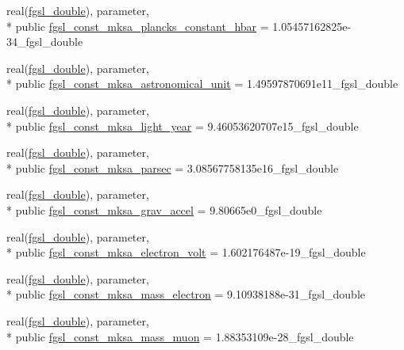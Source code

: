 \begin{DoxyCompactItemize}
\item 
real(\hyperlink{classfgsl_a9af5113378e0f000eb479d3f90196ddf}{fgsl\-\_\-double}), parameter, \\*
public \hyperlink{classfgsl_a505da32ff79a7c317534298642a2ac3c}{fgsl\-\_\-const\-\_\-mksa\-\_\-plancks\-\_\-constant\-\_\-hbar} = 1.\-05457162825e-\/34\-\_\-fgsl\-\_\-double
\item 
real(\hyperlink{classfgsl_a9af5113378e0f000eb479d3f90196ddf}{fgsl\-\_\-double}), parameter, \\*
public \hyperlink{classfgsl_aa2d41436d179db0d4d442c5207737611}{fgsl\-\_\-const\-\_\-mksa\-\_\-astronomical\-\_\-unit} = 1.\-49597870691e11\-\_\-fgsl\-\_\-double
\item 
real(\hyperlink{classfgsl_a9af5113378e0f000eb479d3f90196ddf}{fgsl\-\_\-double}), parameter, \\*
public \hyperlink{classfgsl_ac9efe31fa2e902dc8cced7ce8b82c610}{fgsl\-\_\-const\-\_\-mksa\-\_\-light\-\_\-year} = 9.\-46053620707e15\-\_\-fgsl\-\_\-double
\item 
real(\hyperlink{classfgsl_a9af5113378e0f000eb479d3f90196ddf}{fgsl\-\_\-double}), parameter, \\*
public \hyperlink{classfgsl_ab701318a50ffa3b0b31f26f7882a2b16}{fgsl\-\_\-const\-\_\-mksa\-\_\-parsec} = 3.\-08567758135e16\-\_\-fgsl\-\_\-double
\item 
real(\hyperlink{classfgsl_a9af5113378e0f000eb479d3f90196ddf}{fgsl\-\_\-double}), parameter, \\*
public \hyperlink{classfgsl_a7c644841a5ff5cd815dca7cfc3383642}{fgsl\-\_\-const\-\_\-mksa\-\_\-grav\-\_\-accel} = 9.\-80665e0\-\_\-fgsl\-\_\-double
\item 
real(\hyperlink{classfgsl_a9af5113378e0f000eb479d3f90196ddf}{fgsl\-\_\-double}), parameter, \\*
public \hyperlink{classfgsl_a2b715db04903e667b5f50d6df3054bee}{fgsl\-\_\-const\-\_\-mksa\-\_\-electron\-\_\-volt} = 1.\-602176487e-\/19\-\_\-fgsl\-\_\-double
\item 
real(\hyperlink{classfgsl_a9af5113378e0f000eb479d3f90196ddf}{fgsl\-\_\-double}), parameter, \\*
public \hyperlink{classfgsl_a9b37f99c3856817b93dd18bc94b81725}{fgsl\-\_\-const\-\_\-mksa\-\_\-mass\-\_\-electron} = 9.\-10938188e-\/31\-\_\-fgsl\-\_\-double
\item 
real(\hyperlink{classfgsl_a9af5113378e0f000eb479d3f90196ddf}{fgsl\-\_\-double}), parameter, \\*
public \hyperlink{classfgsl_afcace800f07f1c2e9703336d2ff02ba4}{fgsl\-\_\-const\-\_\-mksa\-\_\-mass\-\_\-muon} = 1.\-88353109e-\/28\-\_\-fgsl\-\_\-double

\end{DoxyCompactItemize}
